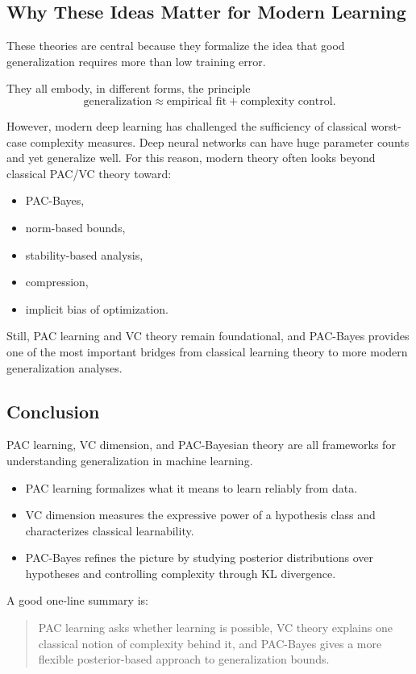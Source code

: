 \subsection{Why These Ideas Matter for Modern Learning}

These theories are central because they formalize the idea that good generalization requires more than low training error.

They all embody, in different forms, the principle
\[
\text{generalization} \approx \text{empirical fit} + \text{complexity control}.
\]

However, modern deep learning has challenged the sufficiency of classical worst-case complexity measures. Deep neural networks can have huge parameter counts and yet generalize well. For this reason, modern theory often looks beyond classical PAC/VC theory toward:
\begin{itemize}
    \item PAC-Bayes,
    \item norm-based bounds,
    \item stability-based analysis,
    \item compression,
    \item implicit bias of optimization.
\end{itemize}

Still, PAC learning and VC theory remain foundational, and PAC-Bayes provides one of the most important bridges from classical learning theory to more modern generalization analyses.

\subsection{Conclusion}

PAC learning, VC dimension, and PAC-Bayesian theory are all frameworks for understanding generalization in machine learning.

\begin{itemize}
    \item PAC learning formalizes what it means to learn reliably from data.
    \item VC dimension measures the expressive power of a hypothesis class and characterizes classical learnability.
    \item PAC-Bayes refines the picture by studying posterior distributions over hypotheses and controlling complexity through KL divergence.
\end{itemize}

A good one-line summary is:

\begin{quote}
PAC learning asks whether learning is possible, VC theory explains one classical notion of complexity behind it, and PAC-Bayes gives a more flexible posterior-based approach to generalization bounds.
\end{quote}